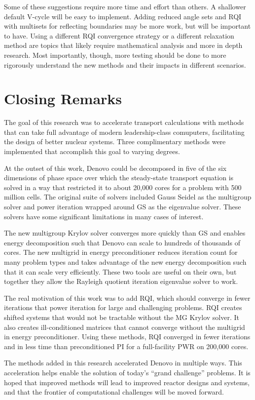 Some of these suggestions require more time and effort than others. A shallower default V-cycle will be easy to implement. Adding reduced angle sets and RQI with multisets for reflecting boundaries may be more work, but will be important to have. Using a different RQI convergence strategy or a different relaxation method are topics that likely require mathematical analysis and more in depth research. Most importantly, though, more testing should be done to more rigorously understand the new methods and their impacts in different scenarios.  

\section{Closing Remarks}
The goal of this research was to accelerate transport calculations with methods that can take full advantage of modern leadership-class comuputers, facilitating the design of better nuclear systems. Three complimentary methods were implemented that accomplish this goal to varying degrees. 

At the outset of this work, Denovo could be decomposed in five of the six dimensions of phase space over which the steady-state transport equation is solved in a way that restricted it to about 20,000 cores for a problem with 500 million cells. The original suite of solvers included Gauss Seidel as the multigroup solver and power iteration wrapped around GS as the eigenvalue solver. These solvers have some significant limitations in many cases of interest. 

The new multigroup Krylov solver converges more quickly than GS and enables energy decomposition such that Denovo can scale to hundreds of thousands of cores. The new multigrid in energy preconditioner reduces iteration count for many problem types and takes advantage of the new energy decomposition such that it can scale very efficiently. These two tools are useful on their own, but together they allow the Rayleigh quotient iteration eigenvalue solver to work.

The real motivation of this work was to add RQI, which should converge in fewer iterations that power iteration for large and challenging problems. RQI creates shifted systems that would not be tractable without the MG Krylov solver. It also creates ill-conditioned matrices that cannot converge without the multigrid in energy preconditioner. Using these methods, RQI converged in fewer iterations and in less time than preconditioned PI for a full-facility PWR on 200,000 cores. 

The methods added in this research accelerated Denovo in multiple ways. This acceleration helps enable the solution of today's ``grand challenge'' problems. It is hoped that improved methods will lead to improved reactor designs and systems, and that the frontier of computational challenges will be moved forward.  


\separatorpage{}
